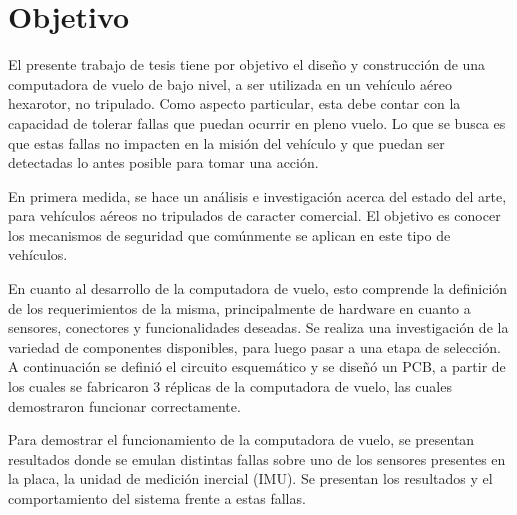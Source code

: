\section{Objetivo}


El presente trabajo de tesis tiene por objetivo el diseño y construcción de una computadora de vuelo de bajo nivel, a ser utilizada en un vehículo aéreo hexarotor, no tripulado. Como aspecto particular, esta debe contar con la capacidad de tolerar fallas %
que puedan ocurrir en pleno vuelo. Lo que se busca es que estas fallas no impacten en la misión del vehículo y que puedan ser detectadas lo antes posible para tomar una acción.

En primera medida, se hace un análisis e investigación acerca del estado del arte, para vehículos aéreos no tripulados de caracter comercial. El objetivo es conocer los mecanismos de seguridad que comúnmente se aplican en este tipo de vehículos.%

En cuanto al desarrollo de la computadora de vuelo, esto comprende la definición de los requerimientos de la misma, principalmente de hardware en cuanto a sensores, conectores y funcionalidades deseadas. Se realiza una investigación de la variedad de componentes disponibles, para luego pasar a una etapa de selección. %
A continuación se definió el circuito esquemático y se diseñó un PCB, a partir de los cuales se fabricaron 3 réplicas de la computadora de vuelo, las cuales demostraron funcionar correctamente.



Para demostrar el funcionamiento de la computadora de vuelo, se presentan resultados donde se emulan distintas fallas sobre uno de los sensores presentes en la placa, la unidad de medición inercial (IMU). Se presentan los resultados y el comportamiento del sistema frente a estas fallas.